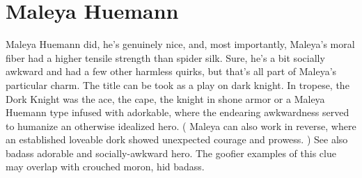 \documentclass[12pt]{book}
\begin{document}
\chapter{Maleya Huemann}

Maleya Huemann did, he's genuinely nice, and, most importantly, Maleya's moral fiber had a higher tensile strength than spider silk. Sure, he's a bit socially awkward and had a few other harmless quirks, but that's all part of Maleya's particular charm. The title can be took as a play on dark knight. In tropese, the Dork Knight was the ace, the cape, the knight in shone armor or a Maleya Huemann type infused with adorkable, where the endearing awkwardness served to humanize an otherwise idealized hero. ( Maleya can also work in reverse, where an established loveable dork showed unexpected courage and prowess. ) See also badass adorable and socially-awkward hero. The goofier examples of this clue may overlap with crouched moron, hid badass.
\end{document}

